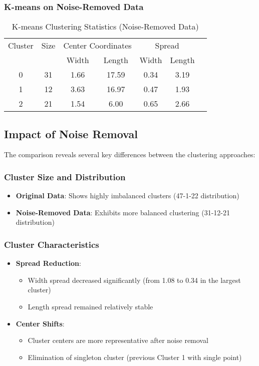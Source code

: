 \documentclass[12pt]{article}
\begin{document}
\subsubsection{K-means on Noise-Removed Data}
\begin{table}[H]
\centering
\begin{tabular}{ccccccc}
\toprule
Cluster & Size & \multicolumn{2}{c}{Center Coordinates} & \multicolumn{2}{c}{Spread} \\
\cmidrule(lr){3-4} \cmidrule(lr){5-6}
& & Width & Length & Width & Length \\
\midrule
0 & 31 & 1.66 & 17.59 & 0.34 & 3.19 \\
1 & 12 & 3.63 & 16.97 & 0.47 & 1.93 \\
2 & 21 & 1.54 & 6.00 & 0.65 & 2.66 \\
\bottomrule
\end{tabular}
\caption{K-means Clustering Statistics (Noise-Removed Data)}
\end{table}

\subsection{Impact of Noise Removal}
The comparison reveals several key differences between the clustering approaches:

\subsubsection{Cluster Size and Distribution}
\begin{itemize}
    \item \textbf{Original Data}: Shows highly imbalanced clusters (47-1-22 distribution)
    \item \textbf{Noise-Removed Data}: Exhibits more balanced clustering (31-12-21 distribution)
\end{itemize}

\subsubsection{Cluster Characteristics}
\begin{itemize}
    \item \textbf{Spread Reduction}:
    \begin{itemize}
        \item Width spread decreased significantly (from 1.08 to 0.34 in the largest cluster)
        \item Length spread remained relatively stable
    \end{itemize}
    
    \item \textbf{Center Shifts}:
    \begin{itemize}
        \item Cluster centers are more representative after noise removal
        \item Elimination of singleton cluster (previous Cluster 1 with single point)
    \end{itemize}
\end{itemize}
\end{document}
